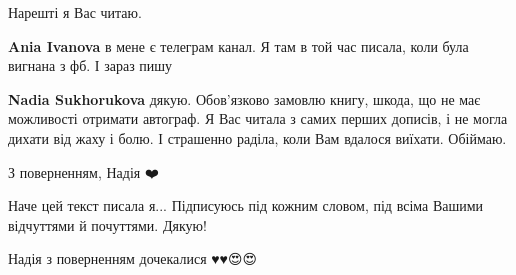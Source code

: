  
 
 
 
 

\qqSecCmt


Нарешті я Вас читаю.

\begin{itemize} %
\textbf{Ania Ivanova} в мене є телеграм канал. Я там в той час писала, коли була вигнана з фб. І зараз пишу

\textbf{Nadia Sukhorukova} дякую. Обов'язково замовлю книгу, шкода, що не має можливості отримати автограф.
Я Вас читала з самих перших дописів, і не могла дихати від жаху і болю. І страшенно раділа, коли Вам вдалося виїхати. Обіймаю.
\end{itemize} %


З поверненням, Надія ❤️


Наче цей текст писала я... Підписуюсь під кожним словом, під всіма Вашими
відчуттями й почуттями. Дякую!


Надія з поверненням дочекалися ♥️♥️😍😍🌹🌹🌹🌹


